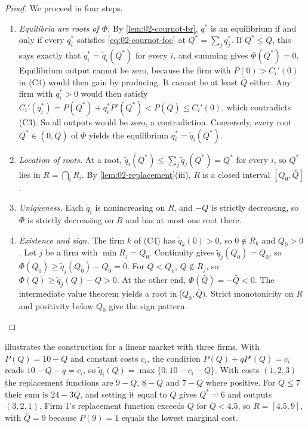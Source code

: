 \begin{proof}
We proceed in four steps.
\begin{enumerate}[label=\arabic*.]
  \item \emph{Equilibria are roots of $\Phi$.} By \cref{lem:02-cournot-br}, $q^*$ is an equilibrium if and only if
  every $q_i^*$ satisfies \eqref{eq:02-cournot-foc} at $Q^* = \sum_j q_j^*$. If $Q^* \le \bar Q$, this says exactly
  that $q_i^* = \tilde q_i(Q^*)$ for every $i$, and summing gives $\Phi(Q^*) = 0$. Equilibrium output cannot be
  zero, because the firm with $P(0) > C_i'(0)$ in (C4) would then gain by producing. It cannot be at least
  $\bar Q$ either. Any firm with $q_i^* > 0$ would then satisfy $C_i'(q_i^*) = P(Q^*) + q_i^*P'(Q^*) < P(\bar Q)
  \le C_i'(0)$, which contradicts (C3). So all outputs would be zero, a contradiction. Conversely, every root
  $Q^* \in (0, \bar Q)$ of $\Phi$ yields the equilibrium $q_i^* = \tilde q_i(Q^*)$.
  \item \emph{Location of roots.} At a root, $\tilde q_i(Q^*) \le \sum_j \tilde q_j(Q^*) = Q^*$ for every $i$, so
  $Q^*$ lies in $R = \bigcap_i R_i$. By \cref{lem:02-replacement}(iii), $R$ is a closed interval $[Q_0, \bar Q]$.
  \item \emph{Uniqueness.} Each $\tilde q_i$ is nonincreasing on $R$, and $-Q$ is strictly decreasing, so $\Phi$ is
  strictly decreasing on $R$ and has at most one root there.
  \item \emph{Existence and sign.} The firm $k$ of (C4) has $\tilde q_k(0) > 0$, so $0 \notin R_k$ and
  $Q_0 > 0$. Let $j$ be a firm with $\min R_j = Q_0$. Continuity gives $\tilde q_j(Q_0) = Q_0$, so
  $\Phi(Q_0) \ge \tilde q_j(Q_0) - Q_0 = 0$. For $Q < Q_0$, $Q \notin R_j$, so $\Phi(Q) \ge \tilde q_j(Q) - Q > 0$.
  At the other end, $\Phi(\bar Q) = -\bar Q < 0$. The intermediate value theorem yields a root in $[Q_0, \bar Q)$.
  Strict monotonicity on $R$ and positivity below $Q_0$ give the sign pattern. \qedhere
\end{enumerate}
\end{proof}

 illustrates the construction for a linear market with three firms. With $P(Q) = 10 - Q$
and constant costs $c_i$, the condition $P(Q) + qP'(Q) = c_i$ reads $10 - Q - q = c_i$, so
$\tilde q_i(Q) = \max\{0, 10 - c_i - Q\}$. With costs $(1, 2, 3)$ the replacement functions are $9 - Q$, $8 - Q$
and $7 - Q$ where positive. For $Q \le 7$ their sum is $24 - 3Q$, and setting it equal to $Q$ gives $Q^* = 6$ and
outputs $(3, 2, 1)$. Firm 1's replacement function exceeds $Q$ for $Q < 4.5$, so $R = [4.5, 9]$, with $\bar Q = 9$
because $P(9) = 1$ equals the lowest marginal cost.

